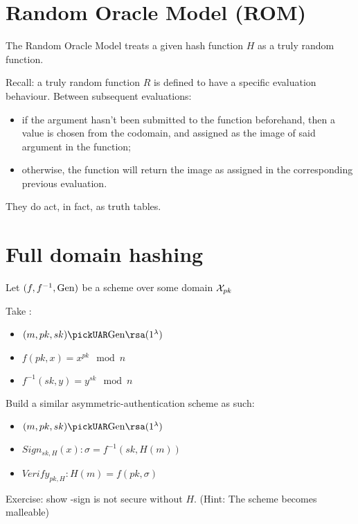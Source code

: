 \section{Random Oracle Model (ROM)}
The Random Oracle Model treats a given hash function $H$ as a truly random function.

Recall: a truly random function $R$ is defined to have a specific evaluation behaviour. Between subsequent evaluations:

\begin{itemize}
    \item if the argument hasn't been submitted to the function beforehand, then a value is chosen \uar{} from the codomain, and assigned as the image of said argument in the function;
    \item otherwise, the function will return the image as assigned in the corresponding previous evaluation.
\end{itemize}

They do act, in fact, as truth tables\footnotemark.


\section{Full domain hashing}

Let $(f, f^{-1}, \mathrm{Gen})$ be a \tdp{} scheme over some domain $\mathcal{X}_{pk}$

Take \rsa:
\begin{itemize}
    \item $(m, pk, sk) \pickUAR \Gen\rsa(1^\lambda)$
    \item $f(pk, x) = x^{pk} \mod n$
    \item $f^{-1}(sk, y) = y^{sk} \mod n$
\end{itemize}

Build a similar asymmetric-authentication scheme as such:

\begin{itemize}
    \item $(m, pk, sk) \pickUAR \Gen\rsa(1^\lambda)$
    \item $Sign_{sk, H}(x): \sigma = f^{-1}(sk, H(m))$
    \item $Verify_{pk, H}: H(m) = f(pk, \sigma)$
\end{itemize}

Exercise: show \rsa-sign is not secure without $H$. (Hint: The scheme becomes malleable)

